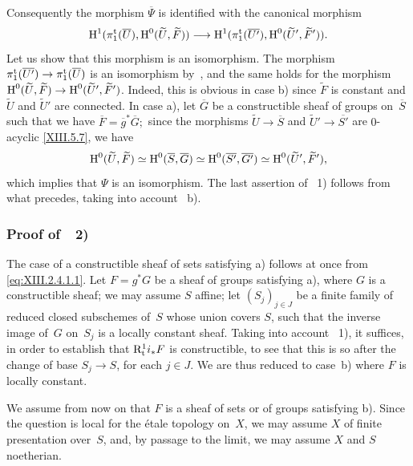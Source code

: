 Consequently the morphism $\overline{\Psi}$ is identified with the
canonical morphism
$$
\H^1(\pi_1^{\tame}(\overline{U}),\H^0(\widetilde{U},\widetilde{F}))
\to
\H^1(\pi_1^{\tame}(\overline{U'}),\H^0(\widetilde{U}',\widetilde{F}')).
$$
Let us show
that this morphism is an isomorphism. The morphism
$\pi_1^{\tame}(\overline{U'})\to\pi_1^{\tame}(\overline{U})$
is an isomorphism by~, and the same
holds for the morphism $\H^0(\widetilde{U},\widetilde{F})\to\allowbreak
\H^0(\widetilde{U}',\widetilde{F}')$. Indeed, this is obvious
in case b) since $\widetilde{F}$ is constant and $\widetilde{U}$ and
$\widetilde{U}'$ are connected. In case a), let $\overline{G}$ be a
constructible sheaf of groups on~$\overline{S}$ such that we have
$\overline{F}=\overline{g}^*\overline{G};$ since the morphisms
$\widetilde{U}\to\overline{S}$ and
$\widetilde{U}'\to\overline{S'}$ are $0$-acyclic
\eqref{XIII.5.7}, we have
$$
\operatorname{H}^0(\widetilde{U},\widetilde{F})\simeq
\operatorname{H}^0(\overline{S},\overline{G}) \simeq
\operatorname{H}^0(\overline{S'},\overline{G'})\simeq
\operatorname{H}^0(\widetilde{U}',\widetilde{F}'),
$$
which implies that $\Psi$ is an isomorphism. The last
assertion of ~1) follows from what precedes,
taking into account ~b).

\subsubsection*{Proof of~~\textup{2)}}

The case of a constructible sheaf of sets satisfying a)
follows at once from \eqref{eq:XIII.2.4.1.1}. Let $F=g^*G$ be a
sheaf of groups satisfying a), where $G$ is a constructible
sheaf; we may assume $S$ affine; let $(S_j)_{j\in J}$ be
a finite family of reduced closed subschemes of~$S$
whose union covers $S$, such that the inverse image of~$G$ on~$S_j$ is a locally constant sheaf. Taking into account
~1), it suffices, in order to establish that $\mathrm{R}^1_{\mathrm{t}}i_*F$
is constructible, to see that this is so after the change
of base $S_j\to S$, for each $j\in J$. We are thus
reduced to case~b) where $F$ is locally constant.

We assume from now on that $F$ is a sheaf of sets or of
groups satisfying b). Since the question is local for the
\'etale topology on~$X$, we may assume $X$ of finite
presentation over~$S$, and, by passage to the limit, we may assume $X$
and $S$ noetherian.

